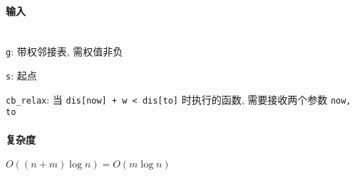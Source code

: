 \paragraph{输入}~\\

\verb|g|: 带权邻接表, 需权值非负

\verb|s|: 起点

\verb|cb_relax|: 当 \verb|dis[now] + w < dis[to]| 时执行的函数, 需要接收两个参数 \verb|now, to|

\paragraph{复杂度}

\(O((n+m)\log n)=O(m\log n)\)
